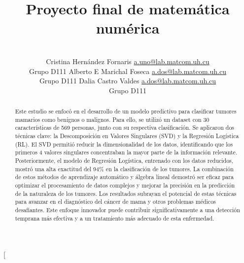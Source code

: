 \documentclass[a4paper,10pt,twocolumn]{article}
\title{Proyecto final de matemática numérica}
\author{\\
\name Cristina Hernández Fornaris \email \href{mailto:a.uno@lab.matcom.uh.cu}{a.uno@lab.matcom.uh.cu}
	\\ \addr Grupo D111 \AND
\name Alberto E Marichal Foseca \email \href{mailto:a.dos@lab.matcom.uh.cu}{a.dos@lab.matcom.uh.cu}
  \\ \addr Grupo D111\AND
\name Dalia Castro Valdes \email \href{mailto:a.dos@lab.matcom.uh.cu}{a.dos@lab.matcom.uh.cu}
  \\ \addr Grupo D111}
\begin{document}
\twocolumn[

\maketitle


\begin{abstract}

	Este estudio se enfocó en el desarrollo de un modelo predictivo para clasificar tumores mamarios como benignos o malignos. Para ello, se utilizó un dataset con 30 características de 569 personas, junto con su respectiva clasificación. Se aplicaron dos técnicas clave: la Descomposición en Valores Singulares (SVD) y la Regresión Logística (RL). El SVD permitió reducir la dimensionalidad de los datos, identificando que los primeros 4 valores singulares concentraban la mayor parte de la información relevante. Posteriormente, el modelo de Regresión Logística, entrenado con los datos reducidos, mostró una alta exactitud del 94\% en la clasificación de los tumores. La combinación de estos métodos de aprendizaje automático y álgebra lineal demostró ser eficaz para optimizar el procesamiento de datos complejos y mejorar la precisión en la predicción de la naturaleza de los tumores. Los resultados subrayan el potencial de estas técnicas para avanzar en el diagnóstico del cáncer de mama y otros problemas médicos desafiantes. Este enfoque innovador puede contribuir significativamente a una detección temprana más efectiva y a un tratamiento más adecuado de esta enfermedad.

\end{abstract}

\vspace{0.5cm}
\end{document}
